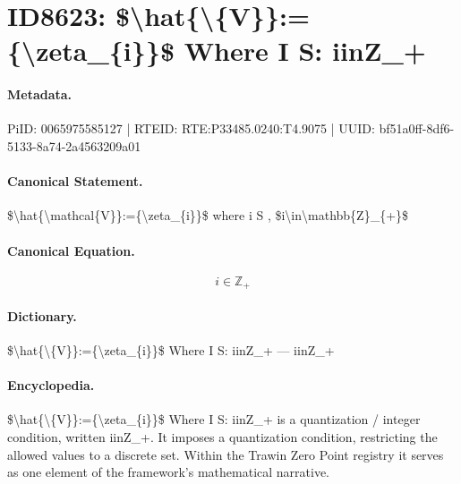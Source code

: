 \section*{ID8623: \$\textbackslash{}hat\{\textbackslash{}\{V\}\}:=\{\textbackslash{}zeta\_\{i\}\}\$ Where I S: iinZ\_+}
\paragraph{Metadata.}
PiID: 0065975585127 | RTEID: RTE:P33485.0240:T4.9075 | UUID: bf51a0ff-8df6-5133-8a74-2a4563209a01

\paragraph{Canonical Statement.}
\$\textbackslash{}hat\{\textbackslash{}mathcal\{V\}\}:=\{\textbackslash{}zeta\_\{i\}\}\$ where i S , \$i\textbackslash{}in\textbackslash{}mathbb\{Z\}\_\{+\}\$

\paragraph{Canonical Equation.}
\[
i\in\mathbb{Z}_{+}
\]

\paragraph{Dictionary.}
\$\textbackslash{}hat\{\textbackslash{}\{V\}\}:=\{\textbackslash{}zeta\_\{i\}\}\$ Where I S: iinZ\_+ — iinZ\_+

\paragraph{Encyclopedia.}
\$\textbackslash{}hat\{\textbackslash{}\{V\}\}:=\{\textbackslash{}zeta\_\{i\}\}\$ Where I S: iinZ\_+ is a quantization / integer condition, written iinZ\_+. It imposes a quantization condition, restricting the allowed values to a discrete set. Within the Trawin Zero Point registry it serves as one element of the framework's mathematical narrative.
